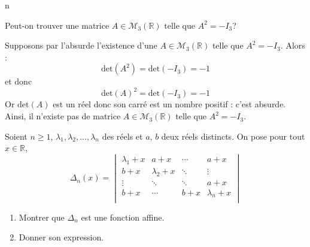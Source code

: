 n\documentclass[a4paper,10pt]{report}
\begin{document}
\begin{Exa} Peut-on trouver une matrice $A \in \mathcal{M}_3(\mathbb{R})$ telle que $A^2= - I_3$?
\end{Exa}

\corr Supposons par l'absurde l'existence d'une $A \in \mathcal{M}_3(\mathbb{R})$ telle que $A^2= - I_3$. Alors :
$$ \textrm{det}(A^2) = \textrm{det}(-I_3) = - 1$$
et donc 
$$ \textrm{det}(A)^2 = \textrm{det}(-I_3) = - 1$$
Or $\textrm{det}(A)$ est un réel donc son carré est un nombre positif : c'est absurde. Ainsi, il n'existe pas de matrice $A \in \mathcal{M}_3(\mathbb{R})$ telle que $A^2= - I_3$.

\begin{Exa} Soient $n \geq 1$, $\lambda_1 ,\lambda_2 ,\ldots,\lambda_n$ des réels et $a$, $b$ deux réels distincts. On pose pour tout $x \in \mathbb{R}$,
    \[
    \Delta_n(x) =
    \begin{vmatrix}
        {\lambda_1 + x} & {a + x} & \cdots & {a + x} \\
        {b + x} & {\lambda_2 + x} & \ddots & \vdots \\
        \vdots & \ddots & \ddots & {a + x} \\
        {b + x} & \cdots & {b + x} & {\lambda_n + x} \\
    \end{vmatrix}    
    \]
    \begin{enumerate}
      \item Montrer que $\Delta_n$ est une fonction affine.
      \item Donner son expression.
    \end{enumerate}
\end{Exa}

\corr 
\end{document}
